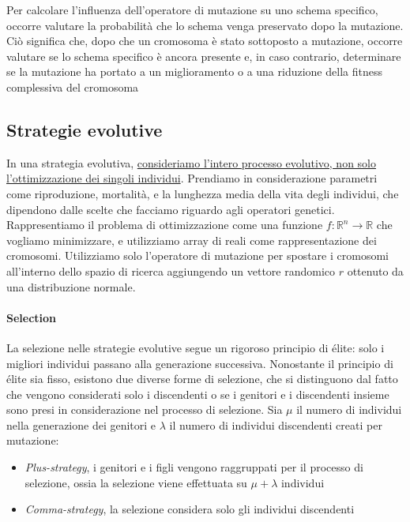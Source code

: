 Per calcolare l'influenza dell'operatore di mutazione su uno schema specifico, occorre valutare la probabilità che lo schema venga preservato dopo la mutazione. Ciò significa che, dopo che un cromosoma è stato sottoposto a mutazione, occorre valutare se lo schema specifico è ancora presente e, in caso contrario, determinare se la mutazione ha portato a un miglioramento o a una riduzione della fitness complessiva del cromosoma

\subsection{Strategie evolutive}
In una strategia evolutiva, \uline{consideriamo l'intero processo evolutivo, non solo l'ottimizzazione dei singoli individui}. Prendiamo in considerazione parametri come riproduzione, mortalità, e la lunghezza media della vita degli individui, che dipendono dalle scelte che facciamo riguardo agli operatori genetici. Rappresentiamo il problema di ottimizzazione come una funzione $f: \mathbb{R}^n \to \mathbb{R}$ che vogliamo minimizzare, e utilizziamo array di reali come rappresentazione dei cromosomi. Utilizziamo solo l'operatore di mutazione per spostare i cromosomi all'interno dello spazio di ricerca aggiungendo un vettore randomico $r$ ottenuto da una distribuzione normale. 

\paragraph{Selection}
La selezione nelle strategie evolutive segue un rigoroso principio di élite: solo i migliori individui passano alla generazione successiva. Nonostante il principio di élite sia fisso, esistono due diverse forme di selezione, che si distinguono dal fatto che vengono considerati solo i discendenti o se i genitori e i discendenti insieme sono presi in considerazione nel processo di selezione. Sia $\mu$ il numero di individui nella generazione dei genitori e $\lambda$ il numero di individui discendenti creati per mutazione:
\begin{itemize}
    \item \textit{Plus-strategy}, i genitori e i figli vengono raggruppati per il processo di selezione, ossia la selezione viene effettuata su $\mu + \lambda$ individui
    \item \textit{Comma-strategy}, la selezione considera solo gli individui discendenti
\end{itemize}


